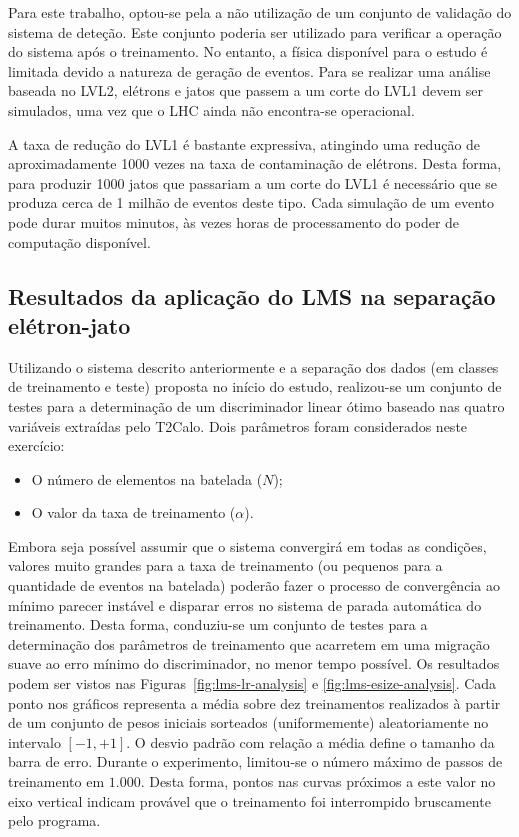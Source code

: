Para este trabalho, optou-se pela a não utilização de um conjunto de validação
do sistema de deteção. Este conjunto poderia ser utilizado para verificar a
operação do sistema após o treinamento. No entanto, a física disponível para o
estudo é limitada devido a natureza de geração de eventos. Para se realizar
uma análise baseada no LVL2, elétrons e jatos que passem a um corte do LVL1
devem ser simulados, uma vez que o LHC ainda não encontra-se operacional. 

A taxa de redução do LVL1 é bastante expressiva, atingindo uma redução de
aproximadamente 1000 vezes na taxa de contaminação de elétrons. Desta forma,
para produzir 1000 jatos que passariam a um corte do LVL1 é necessário que se
produza cerca de 1 milhão de eventos deste tipo. Cada simulação de um evento
pode durar muitos minutos, às vezes horas de processamento do poder de
computação disponível.


\subsection{Resultados da aplicação do LMS na separação e\-lé\-tron-jato}

Utilizando o sistema descrito anteriormente e a separação dos dados (em
classes de treinamento e teste) proposta no início do estudo, realizou-se um
conjunto de testes para a determinação de um discriminador linear ótimo
baseado nas quatro variáveis extraídas pelo T2Calo. Dois parâmetros foram
considerados neste exercício:

\begin{itemize}
\item O número de elementos na batelada ($N$);
\item O valor da taxa de treinamento ($\alpha$).
\end{itemize}

Embora seja possível assumir que o sistema convergirá em todas as condições,
valores muito grandes para a taxa de treinamento (ou pequenos para a
quantidade de eventos na batelada) poderão fazer o processo de convergência ao
mínimo parecer instável e disparar erros no sistema de parada automática do
treinamento. Desta forma, conduziu-se um conjunto de testes para a
determinação dos parâmetros de treinamento que acarretem em uma migração suave
ao erro mínimo do discriminador, no menor tempo possível. Os resultados podem
ser vistos nas Figuras~\ref{fig:lms-lr-analysis} e
\ref{fig:lms-esize-analysis}. Cada ponto nos gráficos representa a média sobre
dez treinamentos realizados à partir de um conjunto de pesos iniciais
sorteados (uniformemente) aleatoriamente no intervalo $[-1, +1]$. O desvio
padrão com relação a média define o tamanho da barra de erro. Durante o
experimento, limitou-se o número máximo de passos de treinamento em
$1.000$. Desta forma, pontos nas curvas próximos a este valor no eixo vertical
indicam provável que o treinamento foi interrompido bruscamente pelo programa.

